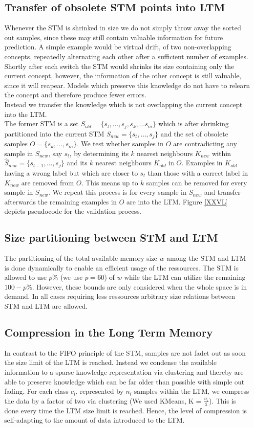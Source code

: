 \documentclass[conference]{IEEEtran}
\begin{document}
\subsection{Transfer of obsolete STM points into LTM}
Whenever the STM is shrinked in size we do not simply throw away the sorted out samples, since these may still contain valuable information for future prediction. A simple example would be virtual drift, of two non-overlapping concepts,
repeatedly alternating each other after a sufficient number of examples. Shortly after each switch the STM would shrinks its size containing only the current concept, however, the information of the other concept is still
valuable, since it will reapear. Models which preserve this knowledge do not have to relearn the concept and therefore produce fewer errors.\\
Instead we transfer the knowledge which is not overlapping the current concept into the LTM.\\
The former STM is a set $S_{old}= \{s_t,...,s_j, s_k,...s_m\}$ which is after shrinking partitioned into the current STM $S_{new} =\{s_t,...,s_j\}$ and the set of obsolete samples $O =\{s_k,...,s_m\}$.
We test whether samples in $O$ are contradicting any sample in $S_{new}$, say $s_t$, by determining its $k$ nearest neighbours $K_{new}$ within 
$\hat{S}_{new} =\{s_{t-1},...,s_j\}$ and its $k$ nearest neighbours $K_{old}$ in $O$. 
Examples in $K_{old}$ having a wrong label but which are closer to $s_t$ than those with a correct label in $K_{new}$ are removed from $O$. This means up to $k$ samples can be removed for every sample in $S_{new}$.
We repeat this process is for every sample in $S_{new}$ and transfer afterwards the remaining examples in $O$ are into the LTM. Figure \ref{XXVL} depicts pseudocode for the validation process. 
\subsection{Size partitioning between STM and LTM}
The partitioning of the total available memory size $w$ among the STM and LTM is done dynamically to enable an efficient usage of the ressources. The STM is allowed to use $p\%$ (we use $p=60$)
of $w$ while the LTM can utilize the remaining $100-p\%$. However, these bounds are only considered when the whole space is in demand. In all cases requiring less ressources arbitrary size relations between STM and LTM are allowed. 
\subsection{Compression in the Long Term Memory}
In contrast to the FIFO principle of the STM, samples are not fadet out as soon the size limit of the LTM is reached. Instead we condense the available information to a sparse knowledge representation via clustering and thereby
are able to preserve knowledge which can be far older than possible with simple out fading. For each class $c_i$, represented by $n_i$ samples within the LTM, 
we compress the data by a factor of two via clustering (We used KMeans\cite{XXVL}, K = $\frac{n_i}{2}$). This is done every time the LTM size limit is reached. 
Hence, the level of compression is self-adapting to the amount of data introduced to the LTM.
\end{document}
